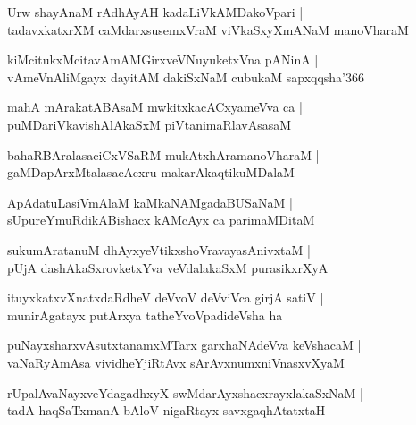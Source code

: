 \documentclass[twoside,12pt,openright]{book}
\newcounter{shloka}[chapter]
\begin{document}
\begin{shloka}%
Urw shayAnaM rAdhAyAH kadaLiVkAMDakoVpari |\\
tadavxkatxrXM caMdarxsusemxVraM viVkaSxyXmANaM manoVharaM 
\end{shloka}

\begin{shloka}%
kiMcitukxMcitavAmAMGirxveVNuyuketxVna pANinA |\\
vAmeVnAliMgayx dayitAM dakiSxNaM cubukaM sapxqqsha\char'366
\end{shloka}

\begin{shloka}%
mahA mArakatABAsaM mwkitxkacACxyameVva ca |\\
puMDariVkavishAlAkaSxM piVtanimaRlavAsasaM 
\end{shloka}

\begin{shloka}%
bahaRBAralasaciCxVSaRM mukAtxhAramanoVharaM |\\
gaMDapArxMtalasacAcxru makarAkaqtikuMDalaM 
\end{shloka}

\begin{shloka}%
ApAdatuLasiVmAlaM kaMkaNAMgadaBUSaNaM |\\
sUpureYmuRdikABishacx kAMcAyx ca parimaMDitaM 
\end{shloka}

\begin{shloka}%
sukumAratanuM dhAyxyeVtikxshoVravayasAnivxtaM |\\
pUjA dashAkaSxrovketxYva veVdalakaSxM purasikxrXyA 
\end{shloka}

\begin{shloka}%
ituyxkatxvXnatxdaRdheV deVvoV deVviVca girjA satiV |\\
munirAgatayx putArxya tatheYvoVpadideVsha ha 
\end{shloka}

\begin{shloka}%
puNayxsharxvAsutxtanamxMTarx garxhaNAdeVva keVshacaM |\\
vaNaRyAmAsa vividheYjiRtAvx sArAvxnumxniVnasxvXyaM 
\end{shloka}

\begin{shloka}%
rUpalAvaNayxveYdagadhxyX swMdarAyxshacxrayxlakaSxNaM |\\
tadA haqSaTxmanA bAloV nigaRtayx savxgaqhAtatxtaH 
\end{shloka}
\end{document}
